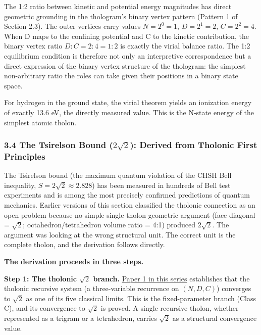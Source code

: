 \documentclass[
  11pt,
  letterpaper,
]{article}
\begin{document}
The 1:2 ratio between kinetic and potential energy magnitudes has direct
geometric grounding in the thologram's binary vertex pattern (Pattern 1
of Section 2.3). The outer vertices carry values \(N = 2^0 = 1\),
\(D = 2^1 = 2\), \(C = 2^2 = 4\). When D maps to the confining potential
and C to the kinetic contribution, the binary vertex ratio
\(D:C = 2:4 = 1:2\) is exactly the virial balance ratio. The 1:2
equilibrium condition is therefore not only an interpretive
correspondence but a direct expression of the binary vertex structure of
the thologram: the simplest non-arbitrary ratio the roles can take given
their positions in a binary state space.

For hydrogen in the ground state, the virial theorem yields an
ionization energy of exactly 13.6 eV, the directly measured value. This
is the N-state energy of the simplest atomic tholon.

\subsubsection{\texorpdfstring{3.4 The Tsirelson Bound (\(2\sqrt{2}\)):
Derived from Tholonic First
Principles}{3.4 The Tsirelson Bound (2\textbackslash sqrt\{2\}): Derived from Tholonic First Principles}}\label{the-tsirelson-bound-2sqrt2-derived-from-tholonic-first-principles}

The Tsirelson bound (the maximum quantum violation of the CHSH Bell
inequality, \(S = 2\sqrt{2} \approx 2.828\)) has been measured in
hundreds of Bell test experiments and is among the most precisely
confirmed predictions of quantum mechanics. Earlier versions of this
section classified the tholonic connection as an open problem because no
simple single-tholon geometric argument (face diagonal = \(\sqrt{2}\);
octahedron/tetrahedron volume ratio = 4:1) produced \(2\sqrt{2}\). The
argument was looking at the wrong structural unit. The correct unit is
the complete tholon, and the derivation follows directly.

\textbf{The derivation proceeds in three steps.}

\textbf{Step 1: The tholonic \(\sqrt{2}\) branch.}
\href{https://github.com/baardev/truevalue/blob/main/docnav/Research/papers/1_recursive-tholonic-five-constants/1_recursive-tholonic-five-constants.pdf}{Paper
1 in this series} establishes that the tholonic recursive system (a
three-variable recurrence on \((N, D, C)\)) converges to \(\sqrt{2}\) as
one of its five classical limits. This is the fixed-parameter branch
(Class C), and its convergence to \(\sqrt{2}\) is proved. A single
recursive tholon, whether represented as a trigram or a tetrahedron,
carries \(\sqrt{2}\) as a structural convergence value.
\end{document}
